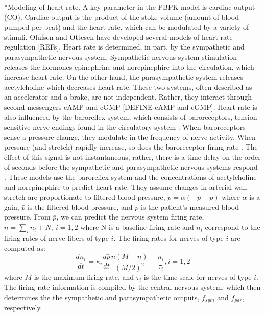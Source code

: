 \documentclass[12pt]{article}
\makeatletter
\renewcommand\subsection{\@startsection
	{subsection}{2}{0mm}
	{-0.05in}
	{-0.5\baselineskip}
	{\normalfont\normalsize\bfseries}}
\makeatother
\begin{document}
\subsection*{Modeling of heart rate.}
A key parameter in the PBPK model is cardiac output (CO). Cardiac output is the product of the stoke volume (amount of blood pumped per beat) and the heart rate, which can be modulated by a variety of stimuli. Olufsen and Ottesen have developed several models of heart rate regulation [REFs].
Heart rate is determined, in part, by the sympathetic and parasympathetic nervous system.
Sympathetic nervous system stimulation releases the hormones epinephrine and norepinephire into the circulation, which increase heart rate.
On the other hand, the parasympathetic system releases acetylcholine which decreases heart rate.
These two systems, often described as an accelerator and a brake, are not independent.
Rather, they interact through second messengers cAMP and cGMP \citep{olshansky2008parasympathetic} [DEFINE cAMP and cGMP].
Heart rate is also influenced by the baroreflex system, which consists of baroreceptors, tension sensitive nerve endings found in the circulatory system \citep{ottesen1997modelling}.
When baroreceptors sense a pressure change, they modulate in the frequency of nerve activity.
When pressure (and stretch) rapidly increase, so does the baroreceptor firing rate \citep{negative1999reflexes}.
The effect of this signal is not instantaneous, rather, there is a time delay on the order of seconds before the sympathetic and parasympathetic nervous systems respond \citep{ottesen1997modelling}. These models use the baroreflex system and the concentrations of acetylcholine and norepinephire to predict heart rate.
They assume changes in arterial wall stretch are proportionate to filtered blood pressure, $\dot{\bar{p}} = \alpha(-\bar p + p)$
where $\alpha$ is a gain, $\bar p$ is the filtered blood pressure, and $p$ is the patient's measured blood pressure.
From $\bar p$, we can predict the nervous system firing rate, $n = \sum_i n_i + N,~i = 1,2$
where N is a baseline firing rate and $n_i$ correspond to the firing rates of nerve fibers of type $i$.
The firing rates for nerves of type $i$ are computed as:
\begin{equation}
\frac{dn_i}{dt} = \kappa_i \frac{d \bar p}{dt} \frac{n(M-n)}{(M/2)^2}-\frac{n_i}{\tau_i}, i = 1,2
\end{equation}
where $M$ is the maximum firing rate, and $\tau_i$ is the time scale for nerves of type $i$.
The firing rate information is compiled by the central nervous system, which then determines the the sympathetic and parasympathetic outputs, $f_{sym}$ and $f_{par}$, respectively.
\end{document}
